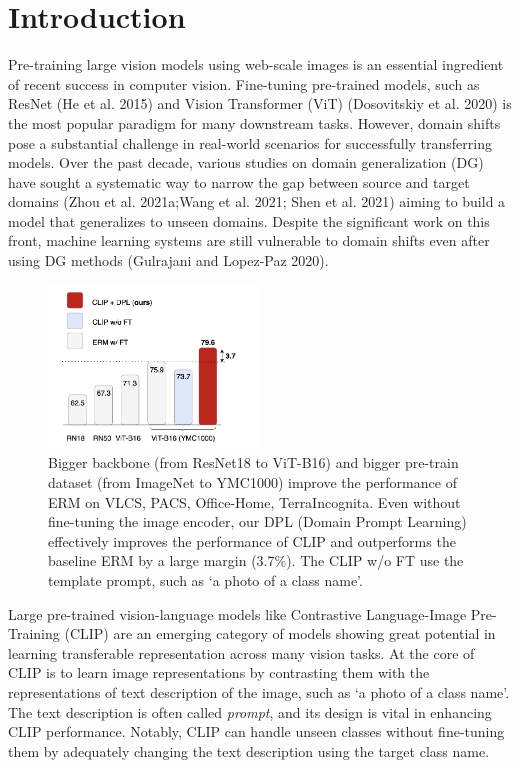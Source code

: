 \documentclass[11pt,twocolumn]{article}
\begin{document}
\section{Introduction}
Pre-training large vision models using web-scale images is
an essential ingredient of recent success in computer vision. Fine-tuning pre-trained models, such as ResNet (He et al. 2015) and Vision Transformer (ViT) (Dosovitskiy et al. 2020) is the most popular paradigm for many downstream tasks. However, domain shifts pose a substantial challenge in real-world scenarios for successfully transferring models. Over the past decade, various studies on domain generalization (DG) have sought a systematic way to narrow the gap between source and target domains (Zhou et al. 2021a;Wang et al. 2021; Shen et al. 2021) aiming to build a model that generalizes to unseen domains. Despite the significant work on this front, machine learning systems are still vulnerable to domain shifts even after using DG methods (Gulrajani and Lopez-Paz 2020).
\newline
\begin{figure}
    \centering
    \includegraphics[width =0.5\textwidth]{Image1.png}
    \caption{Bigger backbone (from ResNet18 to ViT-B16) and bigger pre-train dataset (from ImageNet to YMC1000) improve the performance of ERM on VLCS, PACS, Office-Home, TerraIncognita. Even without fine-tuning the image encoder, our DPL (Domain Prompt Learning) effectively improves the performance of CLIP and outperforms the baseline ERM by a large margin (3.7\%). The CLIP w/o FT use the template prompt, such as ‘a photo of a {class name}’.}
    \label{fig:fig1}
\end{figure}
\hspace{1cm}
Large pre-trained vision-language models like Contrastive Language-Image Pre-Training (CLIP) are an emerging category of models showing great potential in learning transferable representation across many vision tasks. At the core of CLIP is to learn image representations by contrasting them with the representations of text description of the image, such as ‘a photo of a {class name}’. The text description is often called \textit{prompt}, and its design is vital in enhancing CLIP performance. Notably, CLIP can handle unseen classes without fine-tuning them by adequately changing the text description using the target class name. \\
\end{document}
